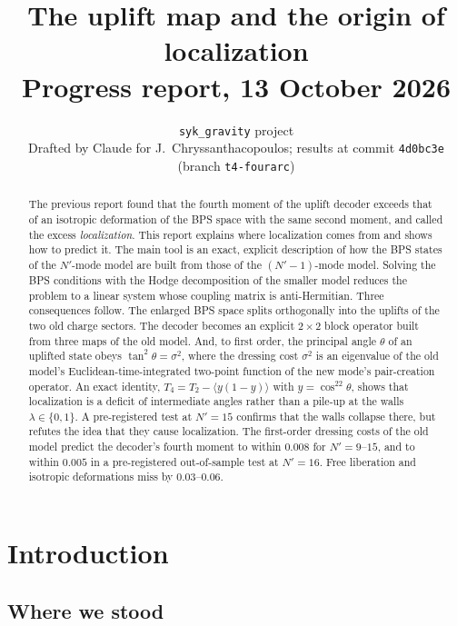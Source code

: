 \documentclass[11pt]{article}
\title{\bf The uplift map and the origin of localization\\[6pt]\large Progress report, 13 October 2026}
\author{\texttt{syk\_gravity} project\\[2pt]\small Drafted by Claude for J.~Chryssanthacopoulos; results at commit
\texttt{4d0bc3e} (branch \texttt{t4-fourarc})}
\date{}
\newcommand{\Np}{N'}
\theoremstyle{plain}
\theoremstyle{remark}
\numberwithin{equation}{section}
\begin{document}
\maketitle

\begin{abstract}
\noindent
The previous report found that the fourth moment of the uplift decoder exceeds that of an isotropic deformation of the
BPS space with the same second moment, and called the excess \emph{localization}. This report explains where
localization comes from and shows how to predict it. The main tool is an exact, explicit description of how the BPS
states of the $\Np$-mode model are built from those of the $(\Np-1)$-mode model. Solving the BPS conditions with the
Hodge decomposition of the smaller model reduces the problem to a linear system whose coupling matrix is
anti-Hermitian. Three consequences follow. The enlarged BPS space splits orthogonally into the uplifts of the two old
charge sectors. The decoder becomes an explicit $2\times2$ block operator built from three maps of the old model. And,
to first order, the principal angle $\theta$ of an uplifted state obeys $\tan^2\theta=\sigma^2$, where the dressing cost
$\sigma^2$ is an eigenvalue of the old model's Euclidean-time-integrated two-point function of the new mode's
pair-creation operator. An exact identity, $T_4=T_2-\langle y(1-y)\rangle$ with $y=\cos^22\theta$, shows that localization
is a deficit of intermediate angles rather than a pile-up at the walls $\lambda\in\{0,1\}$. A pre-registered test at
$\Np=15$ confirms that the walls collapse there, but refutes the idea that they cause localization. The first-order
dressing costs of the old model predict the decoder's fourth moment to within $0.008$ for $\Np=9$--$15$, and to within
$0.005$ in a pre-registered out-of-sample test at $\Np=16$. Free liberation and isotropic deformations miss by
$0.03$--$0.06$.
\end{abstract}

\tableofcontents

\section{Introduction}\label{sec:intro}

\subsection{Where we stood}
\end{document}
